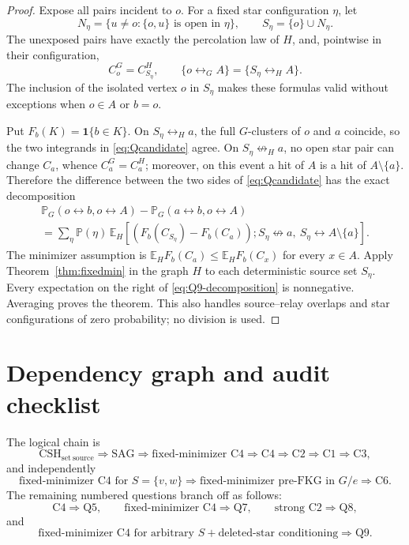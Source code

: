 \documentclass[11pt]{article}
\theoremstyle{definition}
\theoremstyle{remark}
\newcommand{\PP}{\mathbb P}
\newcommand{\EE}{\mathbb E}
\newcommand{\one}{\mathbf 1}
\newcommand{\con}{\leftrightarrow}
\newcommand{\ncon}{\not\leftrightarrow}
\begin{document}
\begin{proof}
Expose all pairs incident to $o$.  For a fixed star configuration $\eta$,
let
\[
 N_\eta=\{u\ne o:\{o,u\}\text{ is open in }\eta\},
 \qquad S_\eta=\{o\}\cup N_\eta.
\]
The unexposed pairs have exactly the percolation law of $H$, and,
pointwise in their configuration,
\begin{equation}\label{eq:star-source-identities}
 C_o^G=C_{S_\eta}^{H},\qquad
 \{o\con_G A\}=\{S_\eta\con_H A\}.
\end{equation}
The inclusion of the isolated vertex $o$ in $S_\eta$ makes these formulas
valid without exceptions when $o\in A$ or $b=o$.

Put $F_b(K)=\one\{b\in K\}$.  On
$S_\eta\con_H a$, the full $G$-clusters of $o$ and $a$ coincide, so the
two integrands in \eqref{eq:Qcandidate} agree.  On
$S_\eta\ncon_H a$, no open star pair can change $C_a$, whence
$C_a^G=C_a^H$; moreover, on this event a hit of $A$ is a hit of
$A\setminus\{a\}$.  Therefore the difference between the two sides of
\eqref{eq:Qcandidate} has the exact decomposition
\begin{multline}\label{eq:Q9-decomposition}
 \PP_G(o\con b,o\con A)-\PP_G(a\con b,o\con A)\\
 =\sum_\eta\PP(\eta)\,
 \EE_H\!\left[(F_b(C_{S_\eta})-F_b(C_a));
 S_\eta\ncon a,\ S_\eta\con A\setminus\{a\}\right].
\end{multline}
The minimizer assumption is
$\EE_H F_b(C_a)\leq\EE_H F_b(C_x)$ for every $x\in A$.  Apply
Theorem~\ref{thm:fixedmin} in the graph $H$ to each deterministic source
set $S_\eta$.  Every expectation on the right of
\eqref{eq:Q9-decomposition} is nonnegative.  Averaging proves the theorem.
This also handles source--relay overlaps and star configurations of zero
probability; no division is used.
\end{proof}

\section{Dependency graph and audit checklist}\label{sec:audit}

The logical chain is
\[
 \boxed{\mathrm{CSH}_{\mathrm{set\ source}}}
 \Longrightarrow
 \boxed{\mathrm{SAG}}
 \Longrightarrow
 \boxed{\text{fixed-minimizer C4}}
 \Longrightarrow
 \boxed{\mathrm{C4}\Rightarrow\mathrm{C2}\Rightarrow\mathrm{C1}
        \Rightarrow\mathrm{C3}},
\]
and independently
\[
 \boxed{\text{fixed-minimizer C4 for }S=\{v,w\}}
 \Longrightarrow
 \boxed{\text{fixed-minimizer pre-FKG in }G/e}
 \Longrightarrow
 \boxed{\mathrm{C6}}.
\]
The remaining numbered questions branch off as follows:
\[
 \boxed{\mathrm{C4}}\Longrightarrow\boxed{\mathrm{Q5}},\qquad
 \boxed{\text{fixed-minimizer C4}}\Longrightarrow\boxed{\mathrm{Q7}},
 \qquad
 \boxed{\text{strong C2}}\Longrightarrow\boxed{\mathrm{Q8}},
\]
and
\[
 \boxed{\text{fixed-minimizer C4 for arbitrary }S}
 \mathrel{+}\boxed{\text{deleted-star conditioning}}
 \Longrightarrow\boxed{\mathrm{Q9}}.
\]
\end{document}
